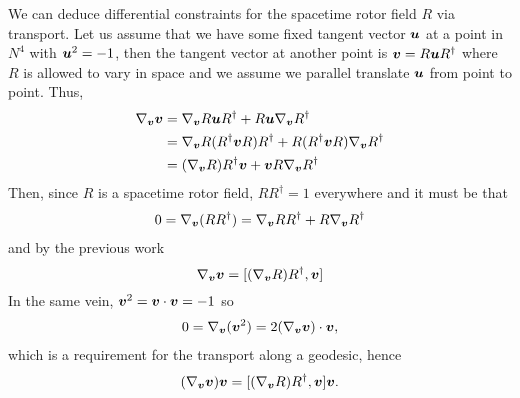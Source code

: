 We can deduce differential constraints for the spacetime rotor field $R$ via transport. Let us assume that we have some fixed tangent vector $\boldsymbol{u}$ at a point in $N^4$ with $\boldsymbol{u}^2 = -1$, then the tangent vector at another point is $\boldsymbol{v}=R\boldsymbol{u}R^\dagger$ where $R$ is allowed to vary in space and we assume we parallel translate $\boldsymbol{u}$ from point to point. Thus,
\begin{align}
    \nabla_{\boldsymbol{v}} {\boldsymbol{v}} &= \nabla_{\boldsymbol{v}} R {\boldsymbol{u}} R^\dagger + R{\boldsymbol{u}} \nabla_{\boldsymbol{v}} R^\dagger \\
    &= \nabla_{\boldsymbol{v}} R(R^\dagger {\boldsymbol{v}} R)R^\dagger + R(R^\dagger {\boldsymbol{v}}R)\nabla_{\boldsymbol{v}} R^\dagger\\
    &= (\nabla_{\boldsymbol{v}} R) R^\dagger {\boldsymbol{v}} + {\boldsymbol{v}} R \nabla_{\boldsymbol{v}} R^\dagger
\end{align}
Then, since $R$ is a spacetime rotor field, $RR^\dagger = 1$ everywhere and it must be that
\begin{align}
    0 = \nabla_{\boldsymbol{v}} (RR^\dagger) = \nabla_{\boldsymbol{v}} R R^\dagger + R\nabla_{\boldsymbol{v}}R^\dagger
\end{align}
and by the previous work 
\begin{equation}
    \nabla_{\boldsymbol{v}} {\boldsymbol{v}} = [(\nabla_{\boldsymbol{v}} R) R^\dagger,{\boldsymbol{v}}]
\end{equation}
In the same vein, ${\boldsymbol{v}}^2={\boldsymbol{v}}\cdot {\boldsymbol{v}}=-1$ so
\begin{align}
    0=\nabla_{\boldsymbol{v}} ({\boldsymbol{v}}^2)=2(\nabla_{\boldsymbol{v}} {\boldsymbol{v}})\cdot {\boldsymbol{v}},
\end{align}
which is a requirement for the transport along a geodesic, hence
\begin{align}
    (\nabla_{\boldsymbol{v}} {\boldsymbol{v}}) {\boldsymbol{v}} = [(\nabla_{\boldsymbol{v}} R)R^\dagger,{\boldsymbol{v}}] {\boldsymbol{v}}.
\end{align}

